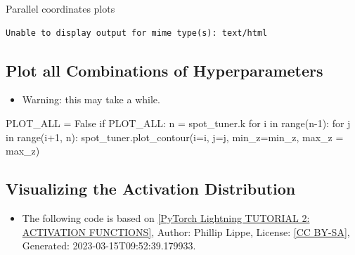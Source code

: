\documentclass[
  letterpaper,
  DIV=11,
  numbers=noendperiod]{scrreprt}
\newenvironment{Shaded}{\begin{snugshade}}{\end{snugshade}}
\newcommand{\BuiltInTok}[1]{\textcolor[rgb]{0.00,0.23,0.31}{#1}}
\newcommand{\ControlFlowTok}[1]{\textcolor[rgb]{0.00,0.23,0.31}{#1}}
\newcommand{\DecValTok}[1]{\textcolor[rgb]{0.68,0.00,0.00}{#1}}
\newcommand{\KeywordTok}[1]{\textcolor[rgb]{0.00,0.23,0.31}{#1}}
\newcommand{\NormalTok}[1]{\textcolor[rgb]{0.00,0.23,0.31}{#1}}
\newcommand{\OperatorTok}[1]{\textcolor[rgb]{0.37,0.37,0.37}{#1}}
\newcommand{\VariableTok}[1]{\textcolor[rgb]{0.07,0.07,0.07}{#1}}
\providecommand{\tightlist}{%
  \setlength{\itemsep}{0pt}\setlength{\parskip}{0pt}}\usepackage{longtable,booktabs,array}
\begin{document}
Parallel coordinates plots

\begin{verbatim}
Unable to display output for mime type(s): text/html
\end{verbatim}

\hypertarget{plot-all-combinations-of-hyperparameters-6}{%
\subsection{Plot all Combinations of
Hyperparameters}\label{plot-all-combinations-of-hyperparameters-6}}

\begin{itemize}
\tightlist
\item
  Warning: this may take a while.
\end{itemize}

\begin{Shaded}
\begin{Highlighting}[]
\NormalTok{PLOT\_ALL }\OperatorTok{=} \VariableTok{False}
\ControlFlowTok{if}\NormalTok{ PLOT\_ALL:}
\NormalTok{    n }\OperatorTok{=}\NormalTok{ spot\_tuner.k}
    \ControlFlowTok{for}\NormalTok{ i }\KeywordTok{in} \BuiltInTok{range}\NormalTok{(n}\OperatorTok{{-}}\DecValTok{1}\NormalTok{):}
        \ControlFlowTok{for}\NormalTok{ j }\KeywordTok{in} \BuiltInTok{range}\NormalTok{(i}\OperatorTok{+}\DecValTok{1}\NormalTok{, n):}
\NormalTok{            spot\_tuner.plot\_contour(i}\OperatorTok{=}\NormalTok{i, j}\OperatorTok{=}\NormalTok{j, min\_z}\OperatorTok{=}\NormalTok{min\_z, max\_z }\OperatorTok{=}\NormalTok{ max\_z)}
\end{Highlighting}
\end{Shaded}

\hypertarget{visualizing-the-activation-distribution}{%
\subsection{Visualizing the Activation
Distribution}\label{visualizing-the-activation-distribution}}

\begin{tcolorbox}[enhanced jigsaw, titlerule=0mm, colbacktitle=quarto-callout-note-color!10!white, coltitle=black, arc=.35mm, toptitle=1mm, colback=white, left=2mm, opacityback=0, bottomtitle=1mm, bottomrule=.15mm, breakable, opacitybacktitle=0.6, colframe=quarto-callout-note-color-frame, rightrule=.15mm, toprule=.15mm, leftrule=.75mm, title=\textcolor{quarto-callout-note-color}{\faInfo}\hspace{0.5em}{Reference:}]

\begin{itemize}
\tightlist
\item
  The following code is based on
  \href{https://lightning.ai/docs/pytorch/stable/notebooks/course_UvA-DL/02-activation-functions.html}{{[}PyTorch
  Lightning TUTORIAL 2: ACTIVATION FUNCTIONS{]}}, Author: Phillip Lippe,
  License: \href{https://creativecommons.org/licenses/by-sa/3.0/}{{[}CC
  BY-SA{]}}, Generated: 2023-03-15T09:52:39.179933.
\end{itemize}

\end{tcolorbox}
\end{document}
